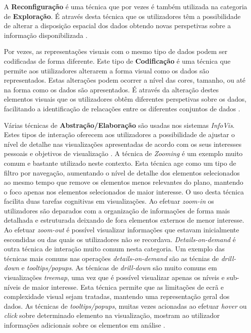 A \textbf{Reconfiguração} é uma técnica que por vezes é também utilizada na categoria de \textbf{Exploração}. É através desta técnica que os utilizadores têm a possibilidade de alterar a disposição espacial dos dados obtendo novas perspetivas sobre a informação disponibilizada \cite{yi2007toward, figueiras2015towards}.

Por vezes, as representações visuais com o mesmo tipo de dados podem ser codificadas de forma diferente. Este tipo de \textbf{Codificação} é uma técnica que permite aos utiilizadores alterarem a forma visual como os dados são representados. Estas alterações podem ocorrer a nível das cores, tamanho, ou até na forma como os dados são apresentados. É através da alteração destes elementos visuais que os utilizadores obtêm diferentes perspetivas sobre os dados, facilitando a identificação de relacações entre os diferentes conjuntos de dados \cite{yi2007toward}.

Várias técnicas de \textbf{Abstração/Elaboração} são usadas nos sistemas \textit{InfoVis}. Estes tipos de interação oferecem aos utilizadores a possibilidade de ajustar o nível de detalhe nas visualizações apresentadas de acordo com os seus interesses pessoais e objetivos de visualização \cite{yi2007toward, figueiras2015towards}. A técnica de \textit{Zooming} é um exemplo muito comum e bastante utilizado neste contexto. Esta técnica age como um tipo de filtro por navegação, aumentando o nível de detalhe dos elementos selecionados ao mesmo tempo que remove os elementos menos relevantes do plano, mantendo o foco apenas nos elementos selecionados de maior interesse. O uso desta técnica facilita duas tarefas cognitivas em visualizações. Ao efetuar \textit{zoom-in} os utilizadores são deparados com a organização de informações de forma mais detalhada e estruturada deixando de fora elementos externos de menor interesse. Ao efetuar \textit{zoom-out} é possível visualizar informações que estavam inicialmente escondidas ou das quais os utilizadores não se recordava. \textit{Details-on-demand} é outra técnica de interação muito comum nesta categoria. Um exemplo das técnicas mais comuns nas operações \textit{details-on-demand} são as técnias de \textit{drill-down} e \textit{tooltips/popups}. As técnicas de \textit{drill-down} são muito comuns em visualizações \textit{treemap}, uma vez que é possível visualizar apenas os níveis e sub-níveis de maior interesse. Esta técnica permite que as limitações de ecrã e complexidade visual sejam tratadas, mantendo uma representação geral dos dados. As técnicas de \textit{tooltips/popups}, muitas vezes acionadas ao efetuar \textit{hover} ou \textit{click} sobre determinado elemento na visualização, mostram ao utilizador informações adicionais sobre os elementos em análise \cite{figueiras2015towards}.

